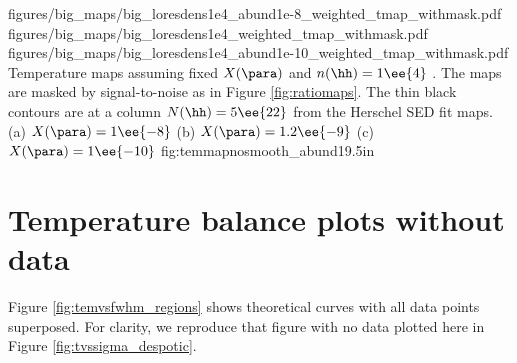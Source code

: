 % 
% 

\RotFigureThreeAA
{figures/big_maps/big_loresdens1e4_abund1e-8_weighted_tmap_withmask.pdf}
{figures/big_maps/big_loresdens1e4_weighted_tmap_withmask.pdf}
{figures/big_maps/big_loresdens1e4_abund1e-10_weighted_tmap_withmask.pdf}
{Temperature maps assuming fixed $X(\para)$ and $n(\hh)=1\ee{4}$ \percc.  The
maps are masked by signal-to-noise as in Figure \ref{fig:ratiomaps}.  The thin
black contours are at a column $N(\hh)=5\ee{22}$ \percc from the Herschel SED
fit maps.
(a) $X(\para) = 1\ee{-8}$
(b) $X(\para) = 1.2\ee{-9}$
(c) $X(\para) = 1\ee{-10}$
}
{fig:temmapnosmooth_abund}{1}{9.5in}

\section{Temperature balance plots without data}
\label{sec:despoticplots}
Figure \ref{fig:temvsfwhm_regions} shows theoretical curves with all data
points superposed.  For clarity, we reproduce that figure with no data plotted
here in Figure \ref{fig:tvssigma_despotic}.

